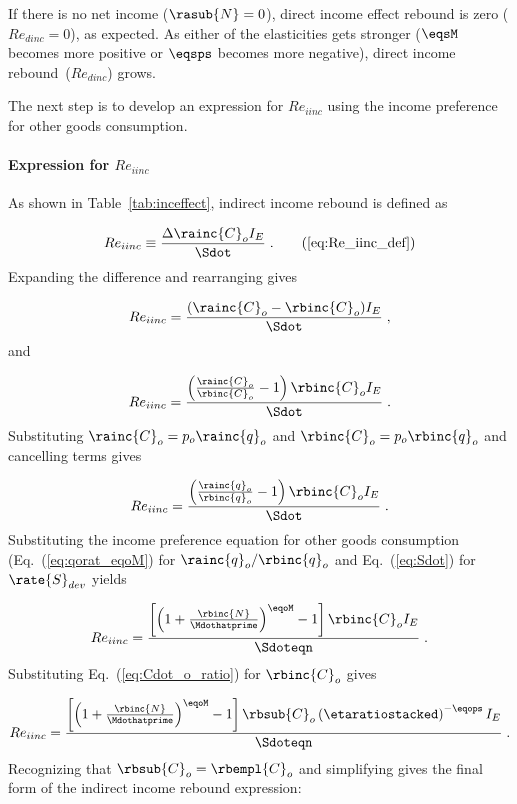 If there is no net income ($\rasub{N} = 0$), 
direct income effect rebound is zero ($Re_{dinc} = 0$), as expected.
As either of the elasticities gets stronger 
($\eqsM$ becomes more positive or $\eqsps$ becomes more negative), 
direct income rebound~($Re_{dinc}$) grows.

The next step is to develop an expression for $Re_{iinc}$
using the income preference for other goods consumption.


\paragraph{Expression for $Re_{iinc}$}
\label{sec:Re_iinc}

As shown in Table~\ref{tab:inceffect}, indirect income rebound is defined as

\begin{equation}
  Re_{iinc} \equiv \frac{\Delta \rainc{C}_o I_E}{\Sdot} \; . \tag{\ref{eq:Re_iinc_def}}
\end{equation}
%
Expanding the difference and rearranging gives

\begin{equation}
  Re_{iinc} = \frac{(\rainc{C}_o - \rbinc{C}_o) I_E}{\Sdot} \; , 
\end{equation}
%
and

\begin{equation}
  Re_{iinc} = \frac{\left( \frac{\rainc{C}_o}{\rbinc{C}_o} - 1  \right) \rbinc{C}_o I_E}{\Sdot} \; .
\end{equation}
%
Substituting $\rainc{C}_o = p_o \rainc{q}_o$ and $\rbinc{C}_o = p_o \rbinc{q}_o$ and
cancelling terms gives

\begin{equation}
  Re_{iinc} = \frac{\left( \frac{\rainc{q}_o}{\rbinc{q}_o} - 1  \right) \rbinc{C}_o I_E}{\Sdot} \; .
\end{equation}
%
Substituting the income preference equation for other goods consumption (Eq.~(\ref{eq:qorat_eqoM}) 
for $\rainc{q}_o / \rbinc{q}_o$
and Eq.~(\ref{eq:Sdot}) for $\rate{S}_{dev}$ yields

\begin{equation}
  Re_{iinc} = \frac{\left[ \left( 1 + \frac{\rbinc{N}}{\Mdothatprime} \right)^{\eqoM} - 1  \right] 
              \rbinc{C}_o I_E}{\Sdoteqn} \; .
\end{equation}
%
Substituting Eq.~(\ref{eq:Cdot_o_ratio}) for $\rbinc{C}_o$ gives

\begin{equation}
  Re_{iinc} = \frac{\left[ \left( 1 + \frac{\rbinc{N}}{\Mdothatprime} \right)^{\eqoM} - 1  \right] 
              \rbsub{C}_o \left( \etaratiostacked \right)^{-\eqops} I_E}{\Sdoteqn} \; .
\end{equation}
%
Recognizing that $\rbsub{C}_o = \rbempl{C}_o$ and simplifying gives the final form 
of the indirect income rebound expression:

